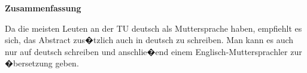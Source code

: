 \thispagestyle{empty}
\vspace*{0.2cm}

\begin{center}
    \textbf{Zusammenfassung}
\end{center}

\vspace*{0.2cm}

\noindent 
{}
Da die meisten Leuten an der TU deutsch als Muttersprache haben, empfiehlt es sich, das Abstract zus�tzlich auch in deutsch zu schreiben. Man kann es auch nur auf deutsch schreiben und anschlie�end einem Englisch-Muttersprachler zur �bersetzung geben.